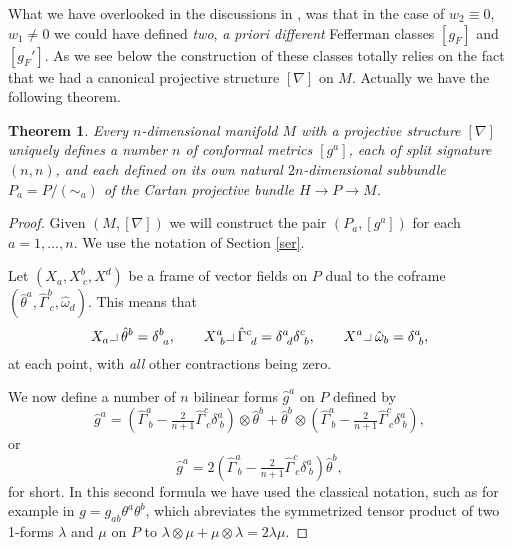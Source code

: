 \documentclass[letterpaper]{amsart}
\newtheorem{theorem}{Theorem}[section]
\theoremstyle{definition}
\theoremstyle{remark}
\newcommand{\be}{\begin{equation}}
\newcommand{\ee}{\end{equation}}
\newcommand{\hook}{\raisebox{-0.35ex}{\makebox[0.6em][r]
{\scriptsize $-$}}\hspace{-0.15em}\raisebox{0.25ex}{\makebox[0.4em][l]{\tiny
 $|$}}}
\begin{document}
What we have overlooked in the discussions in \cite{nn,ns}, was that in the
case of $w_2\equiv 0$, $w_1\neq 0$ we could have defined \emph{two},
\emph{a priori different} Fefferman classes $[g_F]$ and $[g_F']$. As we see below 
the construction of these classes totally relies on the fact that 
we had a canonical projective structure $[\nabla]$ on $M$. Actually we
have the following theorem.

\begin{theorem}
Every $n$-dimensional manifold $M$ with a projective structure
$[\nabla]$ uniquely defines \emph{a number} $n$ of conformal metrics
$[g^a]$, each of \emph{split} signature $(n,n)$, and each 
defined on its own natural $2n$-dimensional subbundle $P_a=P/(\sim_a)$ of the 
Cartan projective bundle $H\to P\to M$.      
\end{theorem}
\begin{proof}
Given $(M,[\nabla])$ we will construct the pair $(P_a,[g^a])$ for each
$a=1,\dots,n$. We use the notation of Section \ref{ser}.


Let $(X_a,X^b_{~c},X^d)$ be a frame of vector fields on $P$ dual
to the coframe
$(\hat{\theta}^a,\hat{\Gamma}^b_{~c},\hat{\omega}_d)$. This means that
\be
X_a\hook \hat{\theta}^b=\delta^b_{~a},\quad\quad
X^a_{~b}\hook\hat{\Gamma}^c_{~d}=\delta^a_{~d}\delta^c_{~b},\quad\quad
X^a\hook\hat{\omega}_b=\delta^a_{~b},\label{hooks}\ee
at each point, with \emph{all} other contractions being zero. 

We now
define a number of $n$ bilinear forms $\hat{g}^a$ on $P$ defined by
$$\hat{g}^a=(\hat{\Gamma}^a_{~b}-\tfrac{2}{n+1}\hat{\Gamma}^c_{~c}\delta^a_{~b})\otimes
\hat{\theta}^b+\hat{\theta}^b\otimes(\hat{\Gamma}^a_{~b}-\tfrac{2}{n+1}\hat{\Gamma}^c_{~c}\delta^a_{~b}),$$
or
$$\hat{g}^a=2(\hat{\Gamma}^a_{~b}-\tfrac{2}{n+1}\hat{\Gamma}^c_{~c}\delta^a_{~b})\hat{\theta}^b,$$ 
for short. In this second formula we have used the classical notation, such
as for example in $g=g_{ab}\theta^a\theta^b$, which abreviates the symmetrized tensor product of two
1-forms $\lambda$ and $\mu$ on $P$ to $\lambda\otimes\mu+\mu\otimes\lambda=2\lambda\mu$. 


\end{proof}
\end{document}
